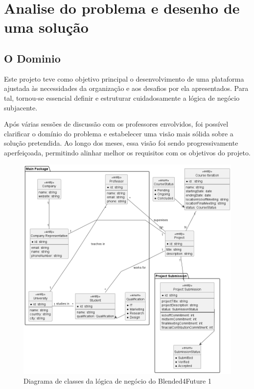 \chapter{Analise do problema e desenho de uma solução}
\label{chap:analisedoproblema}

\section{O Dominio}

Este projeto teve como objetivo principal o desenvolvimento de uma plataforma ajustada às necessidades da organização e aos desafios por ela apresentados. Para tal, tornou-se essencial definir e estruturar cuidadosamente a lógica de negócio subjacente.

Após várias sessões de discussão com os professores envolvidos, foi possível clarificar o domínio do problema e estabelecer uma visão mais sólida sobre a solução pretendida. Ao longo dos meses, essa visão foi sendo progressivamente aperfeiçoada, permitindo alinhar melhor os requisitos com os objetivos do projeto.

\begin{figure}    
    \centering
    \includegraphics[width=\linewidth]{capitulos/cap3-analisedoproblema/assets/domain-diagram/dd.png}
    \caption{Diagrama de classes da lógica de negócio do Blended4Future 1}
    \label{fig:dd}
\end{figure}


